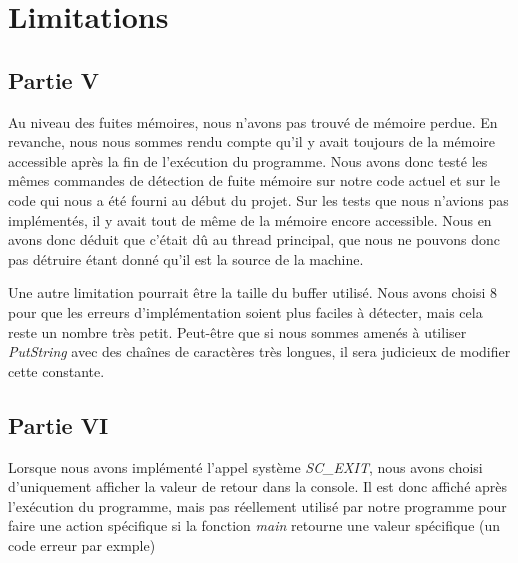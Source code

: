 \documentclass{article}
\begin{document}
\section{Limitations}
\subsection{Partie V}
Au niveau des fuites mémoires, nous n'avons pas trouvé de mémoire perdue. En
revanche, nous nous sommes rendu compte qu'il y avait toujours de la mémoire
accessible après la fin de l'exécution du programme. Nous avons donc testé les
mêmes commandes de détection de fuite mémoire sur notre code actuel et sur le
code qui nous a été fourni au début du projet. Sur les tests que nous n'avions
pas implémentés, il y avait tout de même de la mémoire encore accessible. Nous
en avons donc déduit que c'était dû au thread principal, que nous ne pouvons
donc pas détruire étant donné qu'il est la source de la machine.

Une autre limitation pourrait être la taille du buffer utilisé. Nous avons
choisi 8 pour que les erreurs d'implémentation soient plus faciles à détecter,
mais cela reste un nombre très petit. Peut-être que si nous sommes amenés à
utiliser \textit{PutString} avec des chaînes de caractères très longues, il
sera judicieux de modifier cette constante.

\subsection{Partie VI}
Lorsque nous avons implémenté l'appel système \textit{SC\_EXIT}, nous avons choisi d'uniquement afficher
la valeur de retour dans la console. Il est donc affiché après l'exécution du programme, mais pas réellement
utilisé par notre programme pour faire une action spécifique si la fonction \textit{main} retourne une valeur spécifique
(un code erreur par exmple)
\end{document}
